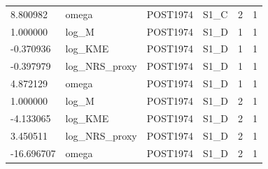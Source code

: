 \begin{tabular}{llllll}
8.800982 & omega & POST1974 & S1\_C & 2 & 1 \\
1.000000 & log\_M & POST1974 & S1\_D & 1 & 1 \\
-0.370936 & log\_KME & POST1974 & S1\_D & 1 & 1 \\
-0.397979 & log\_NRS\_proxy & POST1974 & S1\_D & 1 & 1 \\
4.872129 & omega & POST1974 & S1\_D & 1 & 1 \\
1.000000 & log\_M & POST1974 & S1\_D & 2 & 1 \\
-4.133065 & log\_KME & POST1974 & S1\_D & 2 & 1 \\
3.450511 & log\_NRS\_proxy & POST1974 & S1\_D & 2 & 1 \\
-16.696707 & omega & POST1974 & S1\_D & 2 & 1 \\
\hline
\end{tabular}
